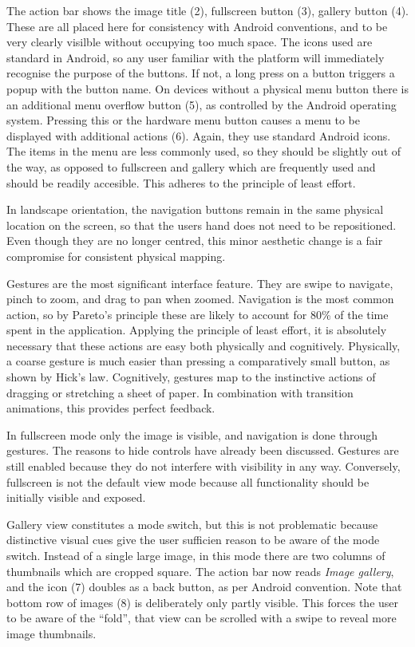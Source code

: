 \documentclass[a4paper,11pt]{article}
\begin{document}
The action bar shows the image title (2), fullscreen button (3), gallery button (4).  These are all placed here for consistency with Android conventions, and to be very clearly visilble without occupying too much space.  The icons used are standard in Android, so any user familiar with the platform will immediately recognise the purpose of the buttons.  If not, a long press on a button triggers a popup with the button name.
On devices without a physical menu button there is an additional menu overflow button (5), as controlled by the Android operating system.  Pressing this or the hardware menu button causes a menu to be displayed with additional actions (6).  Again, they use standard Android icons.  The items in the menu are less commonly used, so they should be slightly out of the way, as opposed to fullscreen and gallery which are frequently used and should be readily accesible.  This adheres to the principle of least effort.

In landscape orientation, the navigation buttons remain in the same physical location on the screen, so that the users hand does not need to be repositioned.  Even though they are no longer centred, this minor aesthetic change is a fair compromise for consistent physical mapping.

Gestures are the most significant interface feature.  They are swipe to navigate, pinch to zoom, and drag to pan when zoomed.  Navigation is the most common action, so by Pareto's principle these are likely to account for 80\% of the time spent in the application.  Applying the principle of least effort, it is absolutely necessary that these actions are easy both physically and cognitively.  Physically, a coarse gesture is much easier than pressing a comparatively small button, as shown by Hick's law.  Cognitively, gestures map to the instinctive actions of dragging or stretching a sheet of paper.  In combination with transition animations, this provides perfect feedback.

In fullscreen mode only the image is visible, and navigation is done through gestures.  The reasons to hide controls have already been discussed.  Gestures are still enabled because they do not interfere with visibility in any way.  Conversely, fullscreen is not the default view mode because all functionality should be initially visible and exposed.

Gallery view constitutes a mode switch, but this is not problematic because distinctive visual cues give the user sufficien reason to be aware of the mode switch.  Instead of a single large image, in this mode there are two columns of thumbnails which are cropped square.  The action bar now reads \emph{Image gallery}, and the icon (7) doubles as a back button, as per Android convention.  Note that bottom row of images (8) is deliberately only partly visible.  This forces the user to be aware of the ``fold'', that view can be scrolled with a swipe to reveal more image thumbnails.
\end{document}
